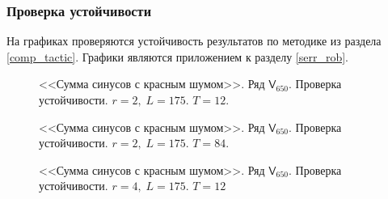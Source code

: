 \documentclass[specialist,
               substylefile = spbu.rtx,
               subf,href,colorlinks=true, 12p]{disser}
\begin{document}
\subsubsection{Проверка устойчивости}
\label{aserr_rob}
На графиках проверяются устойчивость результатов по методике из раздела \ref{comp_tactic}. Графики являются приложением к разделу \ref{serr_rob}.

\begin{figure}[h]
	\captionsetup{justification=centering}
	\caption{<<Сумма синусов с красным шумом>>. Ряд $\mathsf{V}_{650}$. Проверка устойчивости. $r = 2, \; L = 175$. $T = 12$.}
	\label{serrloopsr2.12}
\end{figure}

\begin{figure}[h]
	\captionsetup{justification=centering}
	\caption{<<Сумма синусов с красным шумом>>. Ряд $\mathsf{V}_{650}$. Проверка устойчивости. $r = 2, \; L = 175$. $T = 84$.}
	\label{serrloopsr2.84}
\end{figure}

\begin{figure}[h]
	\captionsetup{justification=centering}
	\caption{<<Сумма синусов с красным шумом>>. Ряд $\mathsf{V}_{650}$. Проверка устойчивости. $r = 4, \; L = 175$. $T = 12$}
	\label{serrloopsr4.12}
\end{figure}
\end{document}
